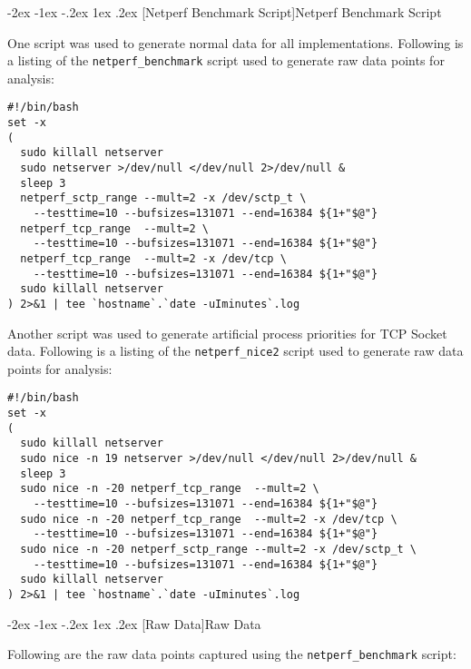 \documentclass[letterpaper,final,notitlepage,twocolumn,10pt,twoside]{article}
\makeatletter
\let\large = \normalsize
\let\normalsize = \small
\let\small = \footnotesize
\let\footnotesize = \scriptsize
\let\scriptsize = \tiny
\renewcommand\section{\@startsection {section}{1}{\z@}%
                                   {-2ex \@plus -1ex \@minus -.2ex}%
                                   {1ex \@plus .2ex}%
                                   {\normalfont\large\bfseries}}
\makeatother
\begin{document}
\clearpage
\begin{appendix}

\section[Netperf Benchmark Script]{Netperf Benchmark Script}
\label{section:script}

One script was used to generate normal data for all implementations.
Following is a listing of the \texttt{netperf\_benchmark} script used to generate raw data points
for analysis:

\footnotesize
\begin{verbatim}
#!/bin/bash
set -x
(
  sudo killall netserver
  sudo netserver >/dev/null </dev/null 2>/dev/null &
  sleep 3
  netperf_sctp_range --mult=2 -x /dev/sctp_t \
    --testtime=10 --bufsizes=131071 --end=16384 ${1+"$@"}
  netperf_tcp_range  --mult=2 \
    --testtime=10 --bufsizes=131071 --end=16384 ${1+"$@"}
  netperf_tcp_range  --mult=2 -x /dev/tcp \
    --testtime=10 --bufsizes=131071 --end=16384 ${1+"$@"}
  sudo killall netserver
) 2>&1 | tee `hostname`.`date -uIminutes`.log
\end{verbatim}
\normalsize

Another script was used to generate artificial process priorities for TCP Socket data.
Following is a listing of the \texttt{netperf\_nice2} script used to generate raw data points for
analysis:

\footnotesize
\begin{verbatim}
#!/bin/bash
set -x
(
  sudo killall netserver
  sudo nice -n 19 netserver >/dev/null </dev/null 2>/dev/null &
  sleep 3
  sudo nice -n -20 netperf_tcp_range  --mult=2 \
    --testtime=10 --bufsizes=131071 --end=16384 ${1+"$@"}
  sudo nice -n -20 netperf_tcp_range  --mult=2 -x /dev/tcp \
    --testtime=10 --bufsizes=131071 --end=16384 ${1+"$@"}
  sudo nice -n -20 netperf_sctp_range --mult=2 -x /dev/sctp_t \
    --testtime=10 --bufsizes=131071 --end=16384 ${1+"$@"}
  sudo killall netserver
) 2>&1 | tee `hostname`.`date -uIminutes`.log
\end{verbatim}
\normalsize

\section[Raw Data]{Raw Data}
\label{section:rawdata}

Following are the raw data points captured using the \texttt{netperf\_benchmark} script:


\end{appendix}
\end{document}
